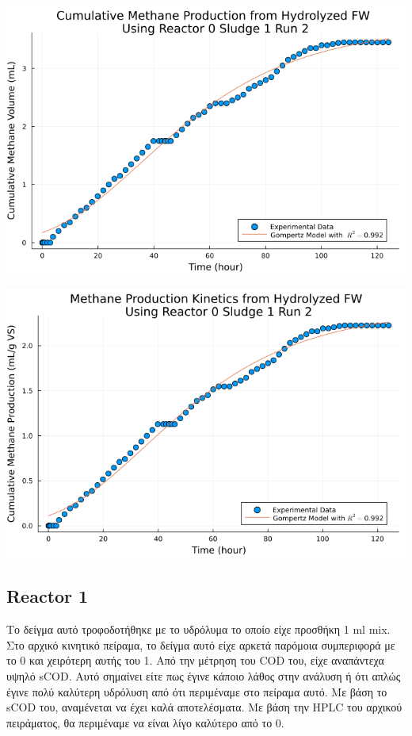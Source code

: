 \documentclass[11pt]{article}
\begin{document}
\begin{center}
\includegraphics[width=.9\linewidth]{../plots/BMPs/Hydrolyzed FW/methane_kinetics_hydrolysate_0_s1_r2_hour.png}
\end{center}

\begin{center}
\includegraphics[width=.9\linewidth]{../plots/BMPs/Hydrolyzed FW/specific_methane_kinetics_hydrolysate_0_s1_r2_hour.png}
\end{center}

\subsection{Reactor 1}
\label{sec:orgd3d69ab}
Το δείγμα αυτό τροφοδοτήθηκε με το υδρόλυμα το οποίο είχε προσθήκη 1 ml mix. Στο αρχικό κινητικό πείραμα, το δείγμα αυτό είχε αρκετά παρόμοια συμπεριφορά με το 0 και χειρότερη αυτής του 1. Από την μέτρηση του COD του, είχε αναπάντεχα υψηλό sCOD. Αυτό σημαίνει είτε πως έγινε κάποιο λάθος στην ανάλυση ή ότι απλώς έγινε πολύ καλύτερη υδρόλυση από ότι περιμέναμε στο πείραμα αυτό. Με βάση το sCOD του, αναμένεται να έχει καλά αποτελέσματα. Με βάση την HPLC του αρχικού πειράματος, θα περιμέναμε να είναι λίγο καλύτερο από το 0.
\end{document}
